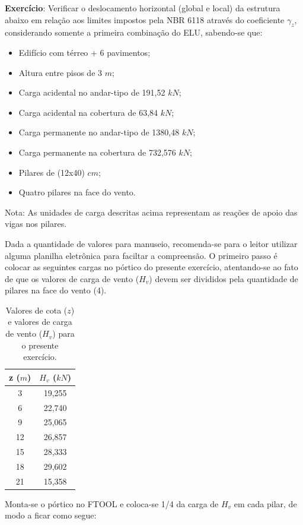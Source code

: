 \textbf{Exercício}: Verificar o deslocamento horizontal (global e local) da estrutura abaixo em relação aos limites impostos pela NBR 6118 através do coeficiente $\gamma_z$, considerando somente a primeira combinação do ELU, sabendo-se que:

\begin{itemize}
	\item Edifício com térreo + 6 pavimentos;
	\item Altura entre pisos de 3 $m$;
	\item Carga acidental no andar-tipo de 191,52 $kN$;
	\item Carga acidental na cobertura de 63,84 $kN$;
	\item Carga permanente no andar-tipo de 1380,48 $kN$;
	\item Carga permanente na cobertura de 732,576 $kN$;
	\item Pilares de (12x40) $cm$;
	\item Quatro pilares na face do vento.
\end{itemize}

Nota: As unidades de carga descritas acima representam as reações de apoio das vigas nos pilares.

Dada a quantidade de valores para manuseio, recomenda-se para o leitor utilizar alguma planilha eletrônica para faciltar a compreensão. O primeiro passo é colocar as seguintes cargas no pórtico do presente exercício, atentando-se ao fato de que os valores de carga de vento ($H_v$) devem ser divididos pela quantidade de pilares na face do vento (4).

\begin{table}[H]
	\centering
	\caption{Valores de cota ($z$) e valores de carga de vento ($H_v$) para o presente exercício.}
	\begin{tabular}{c|c}
	\hline
	z ($m$) & $H_v$ ($kN$) \\ \hline
	3       & 19,255       \\
	6       & 22,740       \\
	9       & 25,065       \\
	12      & 26,857       \\
	15      & 28,333       \\
	18      & 29,602       \\
	21      & 15,358       \\ \hline
	\end{tabular}
\end{table}

Monta-se o pórtico no FTOOL e coloca-se 1/4 da carga de $H_v$ em cada pilar, de modo a ficar como segue:

